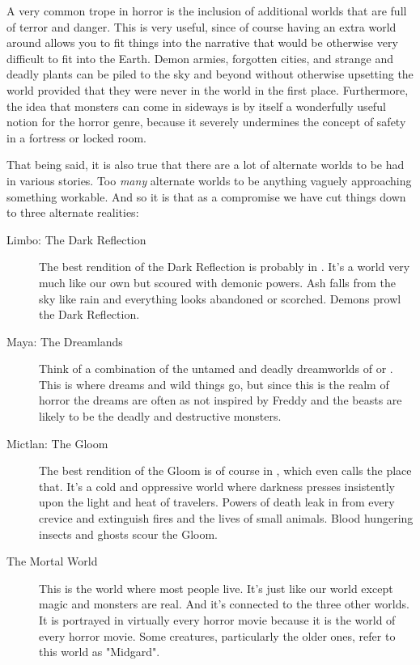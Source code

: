 A very common trope in horror is the inclusion of additional worlds that are full of terror and danger. This is very useful, since of course having an extra world around allows you to fit things into the narrative that would be otherwise very difficult to fit into the Earth. Demon armies, forgotten cities, and strange and deadly plants can be piled to the sky and beyond without otherwise upsetting the world provided that they were never in the world in the first place. Furthermore, the idea that monsters can come in sideways is by itself a wonderfully useful notion for the horror genre, because it severely undermines the concept of safety in a fortress or locked room.

That being said, it is also true that there are a lot of alternate worlds to be had in various stories. Too \textit{many} alternate worlds to be anything vaguely approaching something workable. And so it is that as a compromise we have cut things down to three alternate realities:

\begin{description}
\item[Limbo: The Dark Reflection] The best rendition of the Dark Reflection is probably in . It's a world very much like our own but scoured with demonic powers. Ash falls from the sky like rain and everything looks abandoned or scorched. Demons prowl the Dark Reflection.
\item[Maya: The Dreamlands] Think of a combination of the untamed and deadly dreamworlds of  or . This is where dreams and wild things go, but since this is the realm of horror the dreams are often as not inspired by Freddy and the beasts are likely to be the deadly and destructive monsters.
\item[Mictlan: The Gloom] The best rendition of the Gloom is of course in , which even calls the place that. It's a cold and oppressive world where darkness presses insistently upon the light and heat of travelers. Powers of death leak in from every crevice and extinguish fires and the lives of small animals. Blood hungering insects and ghosts scour the Gloom.
\item[The Mortal World] This is the world where most people live. It's just like our world except magic and monsters are real. And it's connected to the three other worlds. It is portrayed in virtually every horror movie because it is the world of every horror movie. Some creatures, particularly the older ones, refer to this world as "Midgard".
\end{description}

